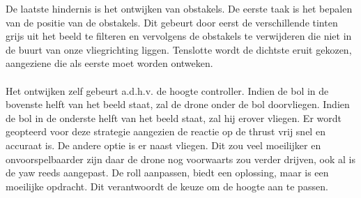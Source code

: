\noindent
De laatste hindernis is het ontwijken van obstakels. De eerste taak is het bepalen van de positie van de obstakels. Dit gebeurt door eerst de verschillende tinten grijs uit het beeld te filteren en vervolgens de obstakels te verwijderen die niet in de buurt van onze vliegrichting liggen. Tenslotte wordt de dichtste eruit gekozen, aangeziene die als eerste moet worden ontweken.
\\
\\
Het ontwijken zelf gebeurt a.d.h.v. de hoogte controller. Indien de bol in de bovenste helft van het beeld staat, zal de drone onder de bol doorvliegen. Indien de bol in de onderste helft van het beeld staat, zal hij erover vliegen. Er wordt geopteerd voor deze strategie aangezien de reactie op de thrust vrij snel en accuraat is. De andere optie is er naast vliegen. Dit zou veel moeilijker en onvoorspelbaarder zijn daar de drone nog voorwaarts zou verder drijven, ook al is de yaw reeds aangepast. De roll aanpassen, biedt een oplossing, maar is een moeilijke opdracht. Dit verantwoordt de keuze om de hoogte aan te passen.